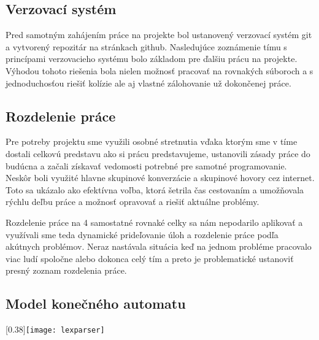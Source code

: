 \documentclass[a4paper]{article}
\begin{document}
\subsection{Verzovací systém}
Pred samotným zahájením práce na projekte bol ustanovený verzovací systém git a vytvorený repozitár na stránkach github. Nasledujúce zoznámenie tímu s princípami verzovacieho systému bolo základom pre ďalšiu prácu na projekte. Výhodou tohoto riešenia bola nielen možnosť pracovať na rovnakých súboroch a s jednoduchosťou riešiť kolízie ale aj vlastné zálohovanie už dokončenej práce.
 
\subsection{Rozdelenie práce}
Pre potreby projektu sme využili osobné stretnutia vďaka ktorým sme v tíme dostali celkovú predstavu ako si prácu predstavujeme, ustanovili zásady práce do budúcna a začali získavať vedomosti potrebné pre samotné programovanie. Neskôr boli využité hlavne skupinové konverzácie a skupinové hovory cez internet. Toto sa ukázalo ako efektívna voľba, ktorá šetrila čas cestovaním a umožňovala rýchlu deľbu práce a možnosť opravovať a riešiť aktuálne problémy.

Rozdelenie práce na 4 samostatné rovnaké celky sa nám nepodarilo aplikovať a využívali sme teda dynamické prideľovanie úloh a rozdelenie práce podľa akútnych problémov. Neraz nastávala situácia keď na jednom probléme pracovalo viac ludí spoločne alebo dokonca celý tím a preto je problematické ustanoviť presný zoznam rozdelenia práce.

\clearpage
\begin{landscape}
\section{Model konečného automatu}
\scalebox{0.40}[0.38]{\texttt{[image: lexparser]}}
\end{landscape}
\clearpage

\newpage
\end{document}
